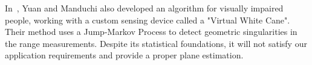 In~\cite{yuan05dynamic}, Yuan and Manduchi also developed an algorithm for
visually impaired people, working with a custom sensing device called
a "Virtual White Cane". Their method uses a Jump-Markov Process to detect
geometric singularities in the range measurements. Despite its statistical
foundations, it will not satisfy our application requirements and
provide a proper plane estimation.
